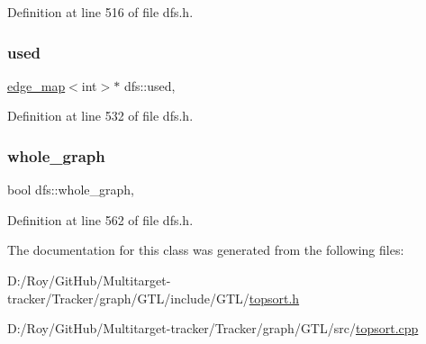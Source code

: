 Definition at line 516 of file dfs.\+h.

\mbox{\label{classdfs_afc18288747491be301d6d8d85d8f220b}} 
\subsubsection{\texorpdfstring{used}{used}}
{\footnotesize\ttfamily \mbox{\hyperlink{classedge__map}{edge\+\_\+map}}$<$int$>$$\ast$ dfs\+::used\hspace{0.3cm}{\ttfamily [protected]}, {\ttfamily [inherited]}}



Definition at line 532 of file dfs.\+h.

\mbox{\label{classdfs_ab8342c80ab208ef0e0d781f0769d0d95}} 
\subsubsection{\texorpdfstring{whole\+\_\+graph}{whole\_graph}}
{\footnotesize\ttfamily bool dfs\+::whole\+\_\+graph\hspace{0.3cm}{\ttfamily [protected]}, {\ttfamily [inherited]}}



Definition at line 562 of file dfs.\+h.



The documentation for this class was generated from the following files\+:\begin{DoxyCompactItemize}
\item 
D\+:/\+Roy/\+Git\+Hub/\+Multitarget-\/tracker/\+Tracker/graph/\+G\+T\+L/include/\+G\+T\+L/\mbox{\hyperlink{topsort_8h}{topsort.\+h}}\item 
D\+:/\+Roy/\+Git\+Hub/\+Multitarget-\/tracker/\+Tracker/graph/\+G\+T\+L/src/\mbox{\hyperlink{topsort_8cpp}{topsort.\+cpp}}\end{DoxyCompactItemize}
